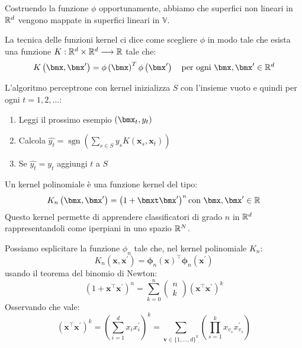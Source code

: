 \documentclass[\main/main.tex]{subfiles}
\begin{document}
\begin{multicols}{2}
\begin{observation}
    Costruendo la funzione \(\phi\) opportunamente, abbiamo che superfici non lineari in \(\mathbb{R}^d\) vengono mappate in superfici lineari in \(\mathbb{V}\).
\end{observation}
\begin{observation}
    La tecnica delle funzioni kernel ci dice come scegliere \(\phi\) in modo tale che esista una funzione \(K:\mathbb{R}^d\times \mathbb{R}^d\longrightarrow \mathbb{R}\) tale che:
    \[
        K\rnd{\bmx, \bmx'} = \phi\rnd{\bmx}^T\phi\rnd{\bmx'} \quad \text{per ogni }\bmx,\bmx' \in \R^d
    \]
\end{observation}
\begin{definition}
    L'algoritmo perceptrone con kernel inizializza \(S\) con l'insieme vuoto e quindi per ogni \(t=1,2,\ldots\):
    \begin{enumerate}
        \item Leggi il prossimo esempio \(\rnd{\bmx_t, y_t}\)
        \item Calcola \(\hat{y_t} = \operatorname{sgn}\left(\sum_{s \in S} y_{s} K\left(\boldsymbol{x}_{s}, \boldsymbol{x}_{t}\right)\right)\)
        \item Se \(\hat{y_t} = y_t\) aggiungi \(t\) a \(S\)
    \end{enumerate}
\end{definition}
\begin{definition}
    Un kernel polinomiale è una funzione kernel del tipo:
    \[
        K_n\rnd{\bmx,\bmx'} = \rnd{1+\bmxt\bmx'}^n \text{con }\bmx,\bmx' \in \R
    \]
    Questo kernel permette di apprendere classificatori di grado \(n\) in \(\mathbb{R}^d\) rappresentandoli come iperpiani in uno spazio \(\mathbb{R}^N\).    
\end{definition}
\begin{definition}
    Possiamo esplicitare la funzione \(\phi_n\) tale che, nel kernel polinomiale \(K_n\):
    \[K_{n}\left(\boldsymbol{x}, \boldsymbol{x}^{\prime}\right)=\boldsymbol{\phi}_{n}(\boldsymbol{x})^{\top} \boldsymbol{\phi}_{n}\left(\boldsymbol{x}^{\prime}\right)\]
    usando il teorema del binomio di Newton:
    \[\left(1+\boldsymbol{x}^{\top} \boldsymbol{x}^{\prime}\right)^{n}=\sum_{k=0}^{n} \left( \begin{array}{l}{n} \\ {k}\end{array}\right)\left(\boldsymbol{x}^{\top} \boldsymbol{x}^{\prime}\right)^{k}\]
    Osservando che vale:
    \[\left(\boldsymbol{x}^{\top} \boldsymbol{x}^{\prime}\right)^{k}=\left(\sum_{i=1}^{d} x_{i} x_{i}^{\prime}\right)^{k}=\sum_{\boldsymbol{v} \in\{1, \ldots, d\}^{k}}\left(\prod_{s=1}^{k} x_{v_{s}} x_{v_{s}}^{\prime}\right)\]

\end{definition}
\end{multicols}
\end{document}
